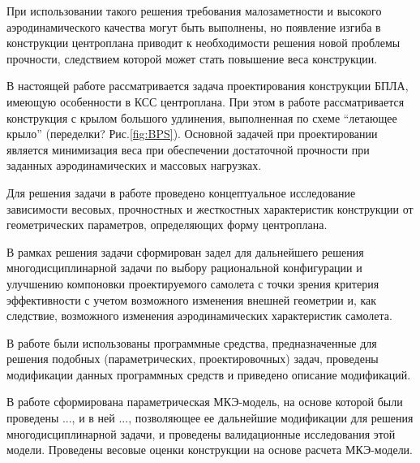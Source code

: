 При использовании такого решения требования малозаметности и высокого аэродинамического качества могут быть выполнены, но появление изгиба  в конструкции центроплана приводит к необходимости решения новой проблемы прочности, следствием которой может стать повышение веса конструкции. 

В настоящей работе рассматривается задача проектирования конструкции БПЛА, имеющую особенности в КСС центроплана. При этом в работе рассматривается конструкция с крылом большого удлинения, выполненная по схеме ``летающее крыло'' (переделки? Рис.\ref{fig:BPS}). Основной задачей при проектировании является минимизация веса при обеспечении достаточной прочности при заданных аэродинамических и массовых нагрузках.








Для решения задачи в работе проведено концептуальное исследование зависимости весовых, прочностных и жесткостных характеристик конструкции от геометрических параметров, определяющих форму центроплана.


В рамках решения задачи сформирован задел для дальнейшего решения многодисциплинарной задачи по выбору рациональной конфигурации и улучшению компоновки проектируемого самолета с точки зрения критерия эффективности с учетом возможного изменения внешней геометрии и, как следствие, возможного изменения аэродинамических характеристик самолета. 

В работе были использованы программные средства, предназначенные для решения подобных (параметрических, проектировочных) задач, проведены модификации данных программных средств и приведено описание модификаций.  

В работе сформирована параметрическая МКЭ-модель, на основе которой были проведены ..., и в ней ..., позволяющее ее дальнейшие модификации для решения многодисциплинарной задачи, и проведены валидационные исследования этой модели. Проведены весовые оценки конструкции на основе расчета МКЭ-модели.   

 